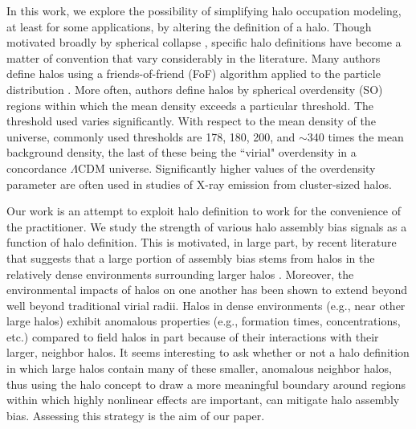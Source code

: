 \documentclass[usenatbib,fleqn]{mnras}
\begin{document}
In this work, we explore the possibility of simplifying halo occupation modeling, at least for some 
applications, by altering the definition of a halo. Though motivated broadly by spherical collapse\citep{gunn_gott72, fillmore_goldreich84, ryden_gunn87, lacey_cole93, eke_etal96, mota_vandebruck04, pace_etal10} , specific halo definitions have become a matter of convention that vary considerably in the literature. Many 
authors define halos using a friends-of-friend (FoF) algorithm applied to the particle distribution . More often, authors define halos by spherical overdensity (SO) regions within which the mean density exceeds a particular threshold. The threshold used 
varies significantly. With respect to the mean density of the universe, 
commonly used thresholds are 178, 180, 200, and $\sim$340 times the mean 
background density, the last of these being the ``virial" overdensity in a concordance $\Lambda$CDM universe. 
Significantly higher values of the overdensity parameter are often used in studies of X-ray emission from cluster-sized halos.


Our work is an attempt to exploit halo definition to work for the 
convenience of the practitioner. We study the strength of various halo assembly bias signals as a function of halo definition. This is motivated, in large part, by recent literature that suggests 
that a large portion of assembly bias stems from halos in the relatively dense environments surrounding larger halos \citep{wang_etal07, warnick_etal08, more_etal15,sunayama_etal16}. Moreover, 
the environmental impacts of halos on one another has been shown to extend beyond well beyond traditional virial radii. 
\citep{adhikari_etal14, diemer_kravtsov14, wetzel_etal14, more_etal15, wetzel_nagai15} Halos in dense environments (e.g., near other large halos) exhibit anomalous properties 
(e.g., formation times, concentrations, etc.) compared to field halos 
in part because of their interactions with their larger, neighbor halos. It seems interesting to ask 
whether or not a halo definition in which large halos contain many of these smaller, anomalous neighbor halos, thus 
using the halo concept to draw a more meaningful boundary around regions within which highly nonlinear effects are important, can mitigate halo assembly bias. Assessing this strategy is the aim of our paper. 
\end{document}
